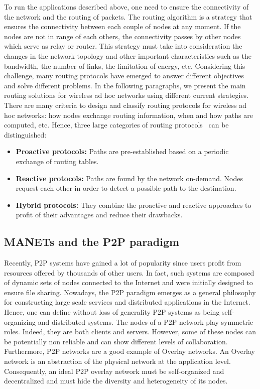 To run the applications described above, one need to ensure the connectivity of the network and the routing of packets. The routing algorithm is a strategy that ensures the connectivity between each couple of nodes at any moment. If the nodes are not in range of each others, the connectivity passes by other nodes which serve as relay or router. This strategy must take into consideration the changes in the network topology and other important characteristics such as the bandwidth, the number of links, the limitation of energy, etc. Considering this challenge, many routing protocols have emerged to answer different objectives and solve different problems.  In the following paragraphs, we present the main routing solutions for wireless ad hoc networks using different current strategies. There are many criteria to design and classify routing protocols for wireless ad hoc networks: how nodes exchange routing information, when and how paths are computed, etc. Hence, three large categories of routing protocols~\cite{Royer:RoutingSurvey,Broch:98performance} can be distinguished:

\begin{itemize}
\item{\textbf{Proactive protocols:} Paths are pre-established based on a periodic exchange of routing tables.}
\item{\textbf{Reactive protocols:} Paths are found by the network on-demand. Nodes request each other in order to detect a possible path to the destination.}
\item{\textbf{Hybrid protocols:} They combine the proactive and reactive approaches to profit of their advantages and reduce their drawbacks.}
\end{itemize}

\subsection{MANETs and the P2P paradigm}

Recently, P2P systems have gained a lot of popularity since users profit from resources offered by thousands of other users. In fact, such systems are composed of dynamic sets of nodes connected to the Internet and were initially designed to ensure file sharing. Nowadays, the P2P paradigm emerges as a general philosophy for constructing large scale services and distributed applications in the Internet. Hence, one can define without loss of generality P2P systems as being self-organizing and distributed systems. The nodes of a P2P network play symmetric roles. Indeed, they are both clients and servers. However, some of these nodes can be potentially non reliable and can show different levels of collaboration. Furthermore, P2P networks are a good example of Overlay networks. An Overlay network is an abstraction of the physical network at the application level. Consequently, an ideal P2P overlay network must be self-organized and decentralized and must hide the diversity and heterogeneity of its nodes.

